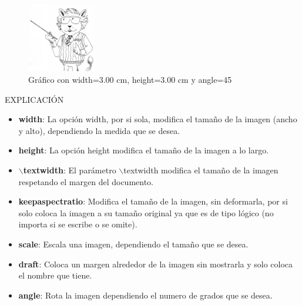 \documentclass[12pt]{article}
\begin{document}
\begin{figure}
\centering
\includegraphics[width=3.0cm, height=3.0cm, angle=45]{LaTeXlion2.png}
\caption{Gráfico con width=3.00 cm, height=3.00 cm y angle=45}
\label{fig:7}
\end{figure}

\begin{center}
\large{\textsc{EXPLICACIÓN}}\\
\end{center}
\begin{itemize}
\item \textbf{width}: La opción width, por si sola, modifica el tamaño de la imagen (ancho y alto), dependiendo la medida que se desea.
\item \textbf{height}: La opción height modifica el tamaño de la imagen a lo largo.
\item \textbf{$\backslash$textwidth}: El parámetro $\backslash$textwidth modifica el tamaño de la imagen respetando el margen del documento.
\item \textbf{keepaspectratio}: Modifica el tamaño de la imagen, sin deformarla, por si solo coloca la imagen a su tamaño original ya que es de tipo lógico (no importa si se escribe o se omite).
\item \textbf{scale}: Escala una imagen, dependiendo el tamaño que se desea.
\item \textbf{draft}: Coloca un margen alrededor de la imagen sin mostrarla y solo coloca el nombre que tiene.
\item \textbf{angle}: Rota la imagen dependiendo el numero de grados que se desea.
\end{itemize}
\end{document}

